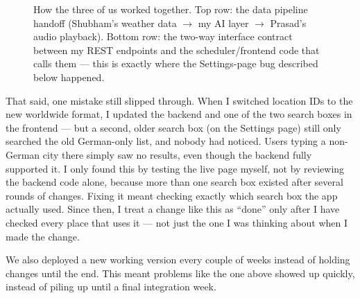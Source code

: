 \documentclass[11pt, a4paper]{article}
\begin{document}
\begin{figure}[H]
  \centering
  \caption{How the three of us worked together. Top row: the data pipeline handoff
           (Shubham's weather data $\to$ my AI layer $\to$ Prasad's audio playback).
           Bottom row: the two-way interface contract between my REST endpoints and
           the scheduler/frontend code that calls them --- this is exactly where the
           Settings-page bug described below happened.}
  \label{fig:collab}
\end{figure}

That said, one mistake still slipped through. When I switched location IDs to the new
worldwide format, I updated the backend and one of the two search boxes in the frontend ---
but a second, older search box (on the Settings page) still only searched the old
German-only list, and nobody had noticed. Users typing a non-German city there simply saw
no results, even though the backend fully supported it. I only found this by testing the
live page myself, not by reviewing the backend code alone, because more than one search box
existed after several rounds of changes. Fixing it meant checking exactly which search box
the app actually used. Since then, I treat a change like this as ``done'' only after I have
checked every place that uses it --- not just the one I was thinking about when I made the
change.

We also deployed a new working version every couple of weeks instead of holding changes
until the end. This meant problems like the one above showed up quickly, instead of piling
up until a final integration week.
\end{document}

